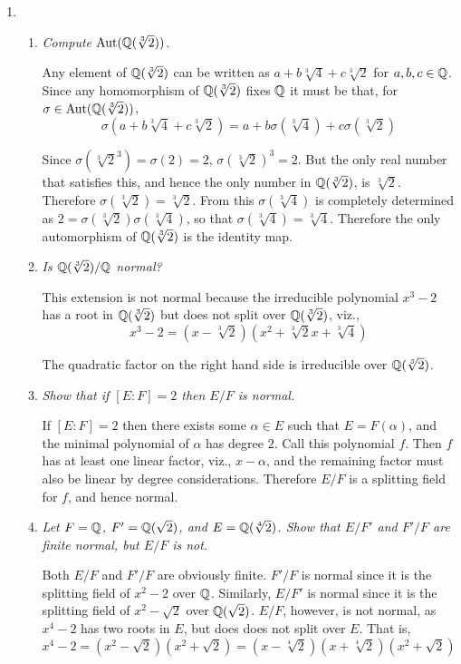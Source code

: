 \documentclass[10pt]{article}
\begin{document}
\begin{enumerate}
\item
\begin{enumerate}
\item \emph{Compute $\operatorname{Aut}(\mathbb{Q}(\sqrt[3]{2}))$.}

Any element of $\mathbb{Q}(\sqrt[3]{2})$ can be written as $a + b\sqrt[3]{4} + c\sqrt[3]{2}$ for $a,b,c \in \mathbb{Q}$.  Since any homomorphism of $\mathbb{Q}(\sqrt[3]{2})$ fixes $\mathbb{Q}$ it must be that, for $\sigma \in \operatorname{Aut}(\mathbb{Q}(\sqrt[3]{2}))$,
\[
\sigma(a + b\sqrt[3]{4} + c\sqrt[3]{2}) = a + b\sigma(\sqrt[3]{4}) + c\sigma(\sqrt[3]{2})
\]

Since $\sigma(\sqrt[3]{2}^3) = \sigma(2) = 2$, $\sigma(\sqrt[3]{2})^3 = 2$.  But the only real number that satisfies this, and hence the only number in $\mathbb{Q}(\sqrt[3]{2})$, is $\sqrt[3]{2}$.  Therefore $\sigma(\sqrt[3]{2}) = \sqrt[3]{2}$.  From this $\sigma(\sqrt[3]{4})$ is completely determined as $2 = \sigma(\sqrt[3]{2})\sigma(\sqrt[3]{4})$, so that $\sigma(\sqrt[3]{4}) = \sqrt[3]{4}$.  Therefore the only automorphism of $\mathbb{Q}(\sqrt[3]{2})$ is the identity map.

\item \emph{Is $\mathbb{Q}(\sqrt[3]{2})/\mathbb{Q}$ normal?}

This extension is not normal because the irreducible polynomial $x^3-2$ has a root in $\mathbb{Q}(\sqrt[3]{2})$ but does not split over $\mathbb{Q}(\sqrt[3]{2})$, viz.,
\[
x^3 - 2 = (x-\sqrt[3]{2})(x^2 + \sqrt[3]{2}x + \sqrt[3]{4})
\]

The quadratic factor on the right hand side is irreducible over $\mathbb{Q}(\sqrt[3]{2})$.

\item \emph{Show that if $[E:F] = 2$ then $E/F$ is normal.}

If $[E:F] = 2$ then there exists some $\alpha \in E$ such that $E = F(\alpha)$, and the minimal polynomial of $\alpha$ has degree $2$.  Call this polynomial $f$.  Then $f$ has at least one linear factor, viz., $x-\alpha$, and the remaining factor must also be linear by degree considerations.  Therefore $E/F$ is a splitting field for $f$, and hence normal.

\item \emph{Let $F = \mathbb{Q}$, $F' = \mathbb{Q}(\sqrt{2})$, and $E = \mathbb{Q}(\sqrt[4]{2})$.  Show that $E/F'$ and $F'/F$ are finite normal, but $E/F$ is not.}

Both $E/F$ and $F'/F$ are obviously finite.  $F'/F$ is normal since it is the splitting field of $x^2 - 2$ over $\mathbb{Q}$.  Similarly, $E/F'$ is normal since it is the splitting field of $x^2 - \sqrt{2}$ over $\mathbb{Q}(\sqrt{2})$. $E/F$, however, is not normal, as $x^4-2$ has two roots in $E$, but does does not split over $E$.  That is,
\[
x^4 - 2 = (x^2 - \sqrt{2})(x^2+\sqrt{2}) = (x-\sqrt[4]{2})(x+\sqrt[4]{2})(x^2+\sqrt{2})
\]


\end{enumerate}
\end{enumerate}
\end{document}
